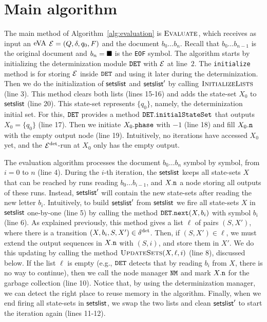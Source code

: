 \section{Main algorithm}
The main method of Algorithm~\ref{alg:evaluation} is $\textproc{Evaluate}$, which receives as input an $\mathrm{eVA}$ $\mathcal{E} = (Q,\delta,q_0,F)$ and the document $b_0 \ldots b_{n}$. Recall that $b_0 \ldots b_{n-1}$ is the original document and $b_n = \blacksquare$ is the \texttt{EOF} symbol.
The algorithm starts by initializing the determinization module $\mathtt{DET}$ with $\mathcal{E}$ at line~$2$. The \texttt{initialize} method is for storing $\mathcal{E}$ inside $\mathtt{DET}$ and using it later during the determinization.
Then we do the initialization of $\textsf{setslist}$ and $\textsf{setslist}'$ by calling $\textproc{InitializeLists}$ (line 3). This method clears both lists (lines 15-16) and adds the state-set $X_0$ to $\textsf{setslist}$ (line 20).
This state-set represents $\{q_0\}$, namely, the determinization initial set. For this, $\mathtt{DET}$ provides a method $\mathtt{DET}.\texttt{initialStateSet}$ that outputs $X_0 = \{q_0\}$ (line 17). Then we initiate $X_0.\texttt{phase}$ with $-1$ (line 18) and fill $X_0.\mathtt{n}$ with the empty output node (line 19). Intuitively, no iterations have accessed $X_0$ yet, and the $\mathcal{E}^{{\operatorname{det}}}$-run at $X_0$ only has the empty output.

The evaluation algorithm processes the document $b_0 \ldots b_{n}$ symbol by symbol, from $i=0$ to $n$ (line 4). During the $i$-th iteration, the $\textsf{setslist}$ keeps all state-sets $X$ that can be reached by runs reading $b_0\ldots b_{i-1}$, and $X.\mathtt{n}$ a node storing all outputs of these runs. Instead, $\textsf{setslist}'$ will contain the new state-sets after reading the new letter $b_i$. Intuitively, to build $\textsf{setslist}'$ from $\textsf{setslist}$ we fire all state-sets $X$ in $\textsf{setslist}$ one-by-one (line 5) by calling the method $\mathtt{DET}.\texttt{next}(X,b_i)$ with symbol $b_i$ (line 6). As explained previously, this method gives a list $\ell$ of pairs $(S, X')$, where there is a transition $(X, b_i, S, X') \in \delta^{{\operatorname{det}}}$. Then, if $(S, X') \in \ell$, we must extend the output sequences in $X.\mathtt{n}$ with $(S, i)$, and store them in $X'$. We do this updating by calling the method $\textproc{UpdateSets}(X,\ell,i)$ (line 8), discussed below.
If the list $\ell$ is empty (e.g., $\mathtt{DET}$ detects that by reading $b_i$ from $X$, there is no way to continue), then we call the node manager $\mathtt{NM}$ and mark $X.\mathtt{n}$ for the garbage collection (line 10). Notice that, by using the determinization manager, we can detect the right place to reuse memory in the algorithm.
Finally, when we end firing all state-sets in $\textsf{setslist}$, we swap the two lists and clean $\textsf{setslist}'$ to start the iteration again (lines 11-12).

